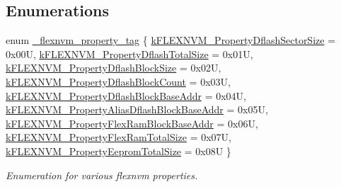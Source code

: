 \subsection*{Enumerations}
\begin{DoxyCompactItemize}
\item 
enum \mbox{\hyperlink{group__ftfx__flexnvm__driver_ga562d369144a5774490de42bfdd66c17b}{\+\_\+flexnvm\+\_\+property\+\_\+tag}} \{ \newline
\mbox{\hyperlink{group__ftfx__flexnvm__driver_gga562d369144a5774490de42bfdd66c17babb7c699af9d864cb78d255081ee85e6a}{k\+F\+L\+E\+X\+N\+V\+M\+\_\+\+Property\+Dflash\+Sector\+Size}} = 0x00U, 
\mbox{\hyperlink{group__ftfx__flexnvm__driver_gga562d369144a5774490de42bfdd66c17baf5223e949fd2bf0c8dafbe48e1b5642e}{k\+F\+L\+E\+X\+N\+V\+M\+\_\+\+Property\+Dflash\+Total\+Size}} = 0x01U, 
\mbox{\hyperlink{group__ftfx__flexnvm__driver_gga562d369144a5774490de42bfdd66c17ba5aa34fc2a56a4e40db25aae4789874e2}{k\+F\+L\+E\+X\+N\+V\+M\+\_\+\+Property\+Dflash\+Block\+Size}} = 0x02U, 
\mbox{\hyperlink{group__ftfx__flexnvm__driver_gga562d369144a5774490de42bfdd66c17ba5d42a9c0d9bab1ccb4c45b629b978ac0}{k\+F\+L\+E\+X\+N\+V\+M\+\_\+\+Property\+Dflash\+Block\+Count}} = 0x03U, 
\newline
\mbox{\hyperlink{group__ftfx__flexnvm__driver_gga562d369144a5774490de42bfdd66c17baf5f1265033121d17accd8eab6c674443}{k\+F\+L\+E\+X\+N\+V\+M\+\_\+\+Property\+Dflash\+Block\+Base\+Addr}} = 0x04U, 
\mbox{\hyperlink{group__ftfx__flexnvm__driver_gga562d369144a5774490de42bfdd66c17ba4eb997109767c75237c2e1f8c69b0d0a}{k\+F\+L\+E\+X\+N\+V\+M\+\_\+\+Property\+Alias\+Dflash\+Block\+Base\+Addr}} = 0x05U, 
\mbox{\hyperlink{group__ftfx__flexnvm__driver_gga562d369144a5774490de42bfdd66c17ba7ea8684b57d6ecd8da49ac2b7111071b}{k\+F\+L\+E\+X\+N\+V\+M\+\_\+\+Property\+Flex\+Ram\+Block\+Base\+Addr}} = 0x06U, 
\mbox{\hyperlink{group__ftfx__flexnvm__driver_gga562d369144a5774490de42bfdd66c17baf21bffab933cd172be155edc6e3d9be8}{k\+F\+L\+E\+X\+N\+V\+M\+\_\+\+Property\+Flex\+Ram\+Total\+Size}} = 0x07U, 
\newline
\mbox{\hyperlink{group__ftfx__flexnvm__driver_gga562d369144a5774490de42bfdd66c17ba75da70ae8381d84ee581cb7e6b8c77e6}{k\+F\+L\+E\+X\+N\+V\+M\+\_\+\+Property\+Eeprom\+Total\+Size}} = 0x08U
 \}
\begin{DoxyCompactList}\small\item\em Enumeration for various flexnvm properties. \end{DoxyCompactList}\end{DoxyCompactItemize}
